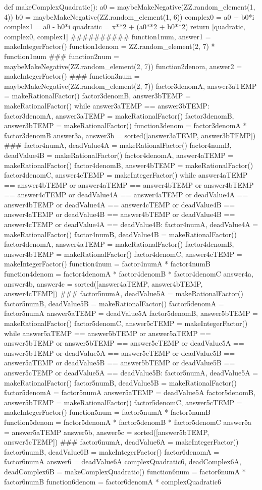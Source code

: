\documentclass{ximera}
\begin{document}
\begin{sagesilent}
def makeComplexQuadratic():
    a0 = maybeMakeNegative(ZZ.random_element(1, 4))
    b0 = maybeMakeNegative(ZZ.random_element(1, 6))
    complex0 = a0 + b0*i
    complex1 = a0 - b0*i
    quadratic = x**2 + (a0**2 + b0**2)
    return [quadratic, complex0, complex1]
##########
function1num, answer1 = makeIntegerFactor()
function1denom = ZZ.random_element(2, 7) * function1num
###
function2num = maybeMakeNegative(ZZ.random_element(2, 7))
function2denom, answer2 = makeIntegerFactor()
###
function3num = maybeMakeNegative(ZZ.random_element(2, 7))
factor3denomA, answer3aTEMP = makeRationalFactor()
factor3denomB, answer3bTEMP = makeRationalFactor()
while answer3aTEMP == answer3bTEMP:
    factor3denomA, answer3aTEMP = makeRationalFactor()
    factor3denomB, answer3bTEMP = makeRationalFactor()
function3denom = factor3denomA * factor3denomB
answer3a, answer3b = sorted([answer3aTEMP, answer3bTEMP])
###
factor4numA, deadValue4A = makeRationalFactor()
factor4numB, deadValue4B = makeRationalFactor()
factor4denomA, answer4aTEMP = makeRationalFactor()
factor4denomB, answer4bTEMP = makeRationalFactor()
factor4denomC, answer4cTEMP = makeIntegerFactor()
while answer4aTEMP == answer4bTEMP or answer4aTEMP == answer4bTEMP or answer4bTEMP == answer4cTEMP or deadValue4A == answer4aTEMP or deadValue4A == answer4bTEMP or deadValue4A == answer4cTEMP or deadValue4B == answer4aTEMP or deadValue4B == answer4bTEMP or deadValue4B == answer4cTEMP or deadValue4A == deadValue4B:
    factor4numA, deadValue4A = makeRationalFactor()
    factor4numB, deadValue4B = makeRationalFactor()
    factor4denomA, answer4aTEMP = makeRationalFactor()
    factor4denomB, answer4bTEMP = makeRationalFactor()
    factor4denomC, answer4cTEMP = makeIntegerFactor()
function4num = factor4numA * factor4numB
function4denom = factor4denomA * factor4denomB * factor4denomC
answer4a, answer4b, answer4c = sorted([answer4aTEMP, answer4bTEMP, answer4cTEMP])
###
factor5numA, deadValue5A = makeRationalFactor()
factor5numB, deadValue5B = makeRationalFactor()
factor5denomA = factor5numA
answer5aTEMP = deadValue5A
factor5denomB, answer5bTEMP = makeRationalFactor()
factor5denomC, answer5cTEMP = makeIntegerFactor()
while answer5aTEMP == answer5bTEMP or answer5aTEMP == answer5bTEMP or answer5bTEMP == answer5cTEMP or deadValue5A == answer5bTEMP or deadValue5A == answer5cTEMP or deadValue5B == answer5aTEMP or deadValue5B == answer5bTEMP or deadValue5B == answer5cTEMP or deadValue5A == deadValue5B:
    factor5numA, deadValue5A = makeRationalFactor()
    factor5numB, deadValue5B = makeRationalFactor()
    factor5denomA = factor5numA
    answer5aTEMP = deadValue5A
    factor5denomB, answer5bTEMP = makeRationalFactor()
    factor5denomC, answer5cTEMP = makeIntegerFactor()
function5num = factor5numA * factor5numB
function5denom = factor5denomA * factor5denomB * factor5denomC
answer5a = answer5aTEMP
answer5b, answer5c = sorted([answer5bTEMP, answer5cTEMP])
###
factor6numA, deadValue6A = makeIntegerFactor()
factor6numB, deadValue6B = makeIntegerFactor()
factor6denomA = factor6numA
answer6 = deadValue6A
complexQuadratic6, deadComplex6A, deadComplex6B = makeComplexQuadratic()
function6num = factor6numA * factor6numB
function6denom = factor6denomA * complexQuadratic6
\end{sagesilent}
 
\end{document}
